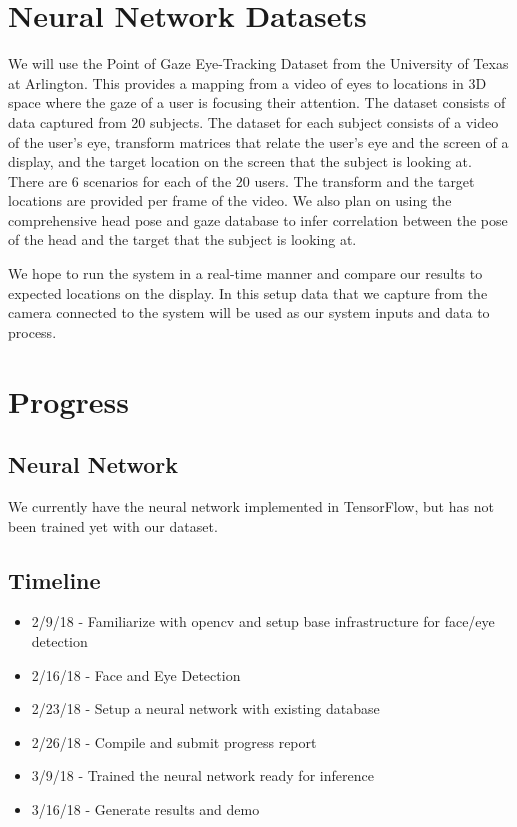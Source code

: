 \documentclass[10pt,twocolumn,letterpaper]{article}
\begin{document}
\section{Neural Network Datasets}
We will use the Point of Gaze Eye-Tracking Dataset from the University
of Texas at Arlington\cite{eyetracking}. This provides a mapping from
a video of eyes to locations in 3D space where the gaze of a user is
focusing their attention. The dataset consists of data captured from
20 subjects. The dataset for each subject consists of a video of the
user’s eye, transform matrices that relate the user’s eye and the
screen of a display, and the target location on the screen that the
subject is looking at. There are 6 scenarios for each of the 20
users. The transform and the target locations are provided per frame
of the video. We also plan on using the comprehensive head pose and
gaze database\cite{mcmourrough} to infer correlation between the pose
of the head and the target that the subject is looking at.

We hope to run the system in a real-time manner and compare our
results to expected locations on the display. In this setup data that
we capture from the camera connected to the system will be used as our
system inputs and data to process.

\section{Progress}

\subsection{Neural Network}
We currently have the neural network implemented in TensorFlow, but
has not been trained yet with our dataset.

\subsection{Timeline}
\begin{itemize}
  \item 2/9/18 - Familiarize with opencv and setup base infrastructure for face/eye detection
  \item 2/16/18 - Face and Eye Detection
  \item 2/23/18 - Setup a neural network with existing database
  \item 2/26/18 - Compile and submit progress report
  \item 3/9/18 - Trained the neural network ready for inference 
  \item 3/16/18 - Generate results and demo
\end{itemize}
\end{document}

